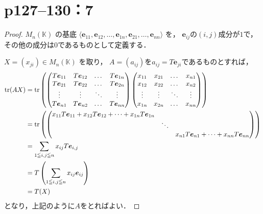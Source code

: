 \documentclass[a4paper,10pt,fleqn]{ltjsarticle}
\begin{document}
\section*{p127--130：7}
\begin{tleftbar}
  \begin{proof}
    $M_n(\mathbb{K})$ の基底 $\langle \bm{e}_{11}, \bm{e}_{12}, \dots, \bm{e}_{1n}, \bm{e}_{21}, \dots, \bm{e}_{nn} \rangle$ を，
    $\bm{e}_{ij}$の$(i,j)$成分が$1$で，その他の成分は$0$であるものとして定義する．

    $X = (x_{ji}) \in M_n(\mathbb{K})$ を取り，
    $A = (a_{ij})$を$a_{ij} = T \bm{e}_{ji}$であるものとすれば，
    \begin{align*}
      \tr (AX) & = \tr \left(
      \begin{pmatrix}
          T \bm{e}_{11} & T \bm{e}_{12} & \dots  & T \bm{e}_{1n} \\
          T \bm{e}_{21} & T \bm{e}_{22} & \dots  & T \bm{e}_{2n} \\
          \vdots        & \vdots        & \ddots & \vdots        \\
          T \bm{e}_{n1} & T \bm{e}_{n2} & \dots  & T \bm{e}_{nn}
        \end{pmatrix}
      \begin{pmatrix}
          x_{11} & x_{21} & \dots  & x_{n1} \\
          x_{12} & x_{22} & \dots  & x_{n2} \\
          \vdots & \vdots & \ddots & \vdots \\
          x_{1n} & x_{2n} & \dots  & x_{nn}
        \end{pmatrix}
      \right)                                                                  \\
               & = \tr \left(
      \begin{pmatrix}
          x_{11}T \bm{e}_{11} + x_{12}T \bm{e}_{12} + \cdots + x_{1n}T \bm{e}_{1n} &                                                             \\
                                                                                   & \ddots &                                                    \\
                                                                                   &        & x_{n1}T \bm{e}_{n1} + \cdots + x_{nn}T \bm{e}_{nn}
        \end{pmatrix}
      \right)                                                                  \\
               & = \sum_{1 \leqq i,j \leqq n} x_{ij} T \bm{e}_{i,j}              \\
               & = T \left(\sum_{1 \leqq i,j \leqq n } x_{ij} \bm{e}_{ij}\right) \\
               & = T(X)
    \end{align*}
    となり，上記のように$A$をとればよい．
  \end{proof}
\end{tleftbar}
\end{document}
